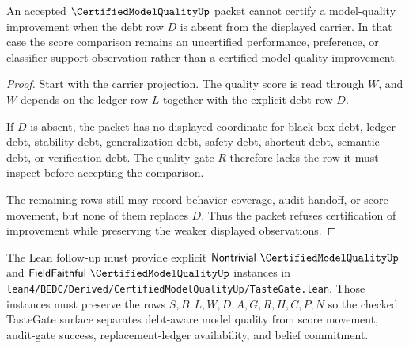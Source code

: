 \begin{theorem}
\label{thm:certified-model-quality-debt-row-gate}
An accepted $\CertifiedModelQualityUp$ packet cannot certify a model-quality improvement when the debt row $D$ is absent from the displayed carrier. In that case the score comparison remains an uncertified performance, preference, or classifier-support observation rather than a certified model-quality improvement.
\end{theorem}
\begin{proof}
Start with the carrier projection. The quality score is read through $W$, and $W$ depends on the ledger row $L$ together with the explicit debt row $D$.

If $D$ is absent, the packet has no displayed coordinate for black-box debt, ledger debt, stability debt, generalization debt, safety debt, shortcut debt, semantic debt, or verification debt. The quality gate $R$ therefore lacks the row it must inspect before accepting the comparison.

The remaining rows still may record behavior coverage, audit handoff, or score movement, but none of them replaces $D$. Thus the packet refuses certification of improvement while preserving the weaker displayed observations.
\end{proof}



The Lean follow-up must provide explicit $\mathsf{Nontrivial}\ \CertifiedModelQualityUp$ and $\mathsf{FieldFaithful}\ \CertifiedModelQualityUp$ instances in \texttt{lean4/BEDC/Derived/CertifiedModelQualityUp/TasteGate.lean}. Those instances must preserve the rows $S,B,L,W,D,A,G,R,H,C,P,N$ so the checked TasteGate surface separates debt-aware model quality from score movement, audit-gate success, replacement-ledger availability, and belief commitment.


